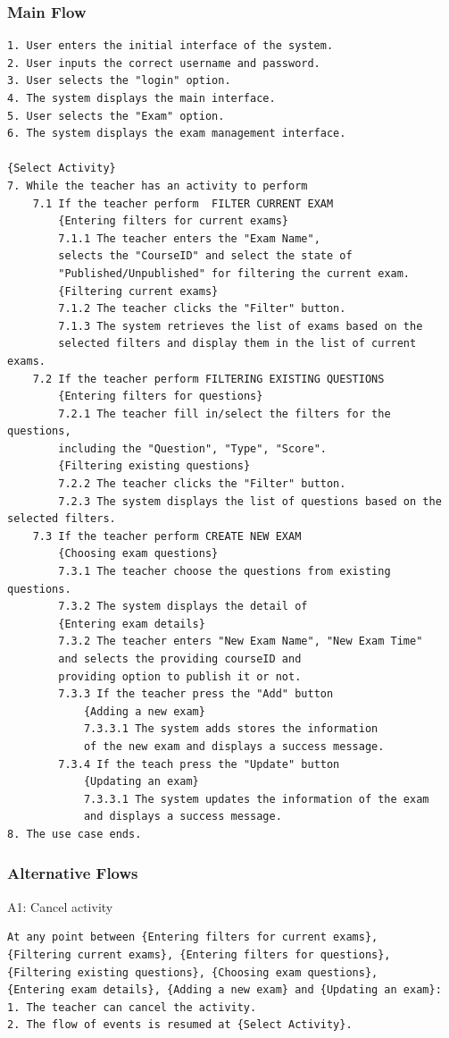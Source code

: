\documentclass{article}
\begin{document}
\subsubsection{Main Flow}
\begin{verbatim}
1. User enters the initial interface of the system.
2. User inputs the correct username and password.
3. User selects the "login" option.
4. The system displays the main interface.
5. User selects the "Exam" option.
6. The system displays the exam management interface.

{Select Activity}
7. While the teacher has an activity to perform
    7.1 If the teacher perform  FILTER CURRENT EXAM
        {Entering filters for current exams}
        7.1.1 The teacher enters the "Exam Name",
        selects the "CourseID" and select the state of 
        "Published/Unpublished" for filtering the current exam.
        {Filtering current exams}
        7.1.2 The teacher clicks the "Filter" button.
        7.1.3 The system retrieves the list of exams based on the 
        selected filters and display them in the list of current exams.
    7.2 If the teacher perform FILTERING EXISTING QUESTIONS
        {Entering filters for questions}
        7.2.1 The teacher fill in/select the filters for the questions,
        including the "Question", "Type", "Score".
        {Filtering existing questions}
        7.2.2 The teacher clicks the "Filter" button.
        7.2.3 The system displays the list of questions based on the selected filters.
    7.3 If the teacher perform CREATE NEW EXAM 
        {Choosing exam questions}
        7.3.1 The teacher choose the questions from existing questions.
        7.3.2 The system displays the detail of 
        {Entering exam details}
        7.3.2 The teacher enters "New Exam Name", "New Exam Time" 
        and selects the providing courseID and 
        providing option to publish it or not.
        7.3.3 If the teacher press the "Add" button
            {Adding a new exam}
            7.3.3.1 The system adds stores the information 
            of the new exam and displays a success message.
        7.3.4 If the teach press the "Update" button
            {Updating an exam}
            7.3.3.1 The system updates the information of the exam
            and displays a success message.
8. The use case ends.
\end{verbatim}
\subsubsection{Alternative Flows}
\noindent A1: Cancel activity
\begin{verbatim}
At any point between {Entering filters for current exams},
{Filtering current exams}, {Entering filters for questions},
{Filtering existing questions}, {Choosing exam questions},
{Entering exam details}, {Adding a new exam} and {Updating an exam}:
1. The teacher can cancel the activity.
2. The flow of events is resumed at {Select Activity}.
\end{verbatim}
\end{document}
